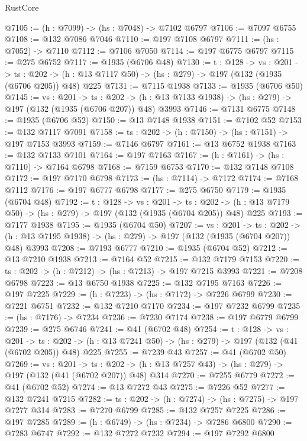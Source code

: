 \begin{lexlean}{RustCore}
\begin{coremodule}
@7105 := (h : @7099) -> (hs : @7048) -> @7102 @6797
@7106 := @7097 @6755
@7108 := @132 @7086 @7046
@7110 := @197 @7108 @6797
@7111 := (hs : @7052) -> @7110
@7112 := @7106 @7050
@7114 := @197 @6775 @6797
@7115 := @275 @6752
@7117 := @1935 (@6706 @48)
@7130 := {t : @128} ->
  {vs : @201} ->
  {ts : @202} -> (h : @13 @7117 @50) -> (hs : @279) -> @197 (@132 (@1935 (@6706 @205)) @48) @225
@7131 := @7115 @1938
@7133 := @1935 (@6706 @50)
@7145 := {vs : @201} ->
  {ts : @202} -> (h : @13 @7133 @1938) -> (hs : @279) -> @197 (@132 (@1935 (@6706 @207)) @48) @3993
@7146 := @7131 @6775
@7148 := @1935 (@6706 @52)
@7150 := @13 @7148 @1938
@7151 := @7102 @52
@7153 := @132 @7117 @7091
@7158 := {ts : @202} -> (h : @7150) -> (hs : @7151) -> @197 @7153 @3993
@7159 := @7146 @6797
@7161 := @13 @6752 @1938
@7163 := @132 @7133 @7101
@7164 := @197 @7163
@7167 := (h : @7161) -> (hs : @7110) -> @7164 @6798
@7168 := @7159 @6753
@7170 := @132 @7148 @7108
@7172 := @197 @7170 @6798
@7173 := (hs : @7114) -> @7172
@7174 := @7168 @7112
@7176 := @197 @6777 @6798
@7177 := @275 @6750
@7179 := @1935 (@6704 @48)
@7192 := {t : @128} ->
  {vs : @201} ->
  {ts : @202} -> (h : @13 @7179 @50) -> (hs : @279) -> @197 (@132 (@1935 (@6704 @205)) @48) @225
@7193 := @7177 @1938
@7195 := @1935 (@6704 @50)
@7207 := {vs : @201} ->
  {ts : @202} -> (h : @13 @7195 @1938) -> (hs : @279) -> @197 (@132 (@1935 (@6704 @207)) @48) @3993
@7208 := @7193 @6777
@7210 := @1935 (@6704 @52)
@7212 := @13 @7210 @1938
@7213 := @7164 @52
@7215 := @132 @7179 @7153
@7220 := {ts : @202} -> (h : @7212) -> (hs : @7213) -> @197 @7215 @3993
@7221 := @7208 @6798
@7223 := @13 @6750 @1938
@7225 := @132 @7195 @7163
@7226 := @197 @7225
@7229 := (h : @7223) -> (hs : @7172) -> @7226 @6799
@7230 := @7221 @6751
@7232 := @132 @7210 @7170
@7234 := @197 @7232 @6799
@7235 := (hs : @7176) -> @7234
@7236 := @7230 @7174
@7238 := @197 @6779 @6799
@7239 := @275 @6746
@7241 := @41 (@6702 @48)
@7254 := {t : @128} ->
  {vs : @201} ->
  {ts : @202} -> (h : @13 @7241 @50) -> (hs : @279) -> @197 (@132 (@41 (@6702 @205)) @48) @225
@7255 := @7239 @43
@7257 := @41 (@6702 @50)
@7269 := {vs : @201} ->
  {ts : @202} -> (h : @13 @7257 @43) -> (hs : @279) -> @197 (@132 (@41 (@6702 @207)) @48) @314
@7270 := @7255 @6779
@7272 := @41 (@6702 @52)
@7274 := @13 @7272 @43
@7275 := @7226 @52
@7277 := @132 @7241 @7215
@7282 := {ts : @202} -> (h : @7274) -> (hs : @7275) -> @197 @7277 @314
@7283 := @7270 @6799
@7285 := @132 @7257 @7225
@7286 := @197 @7285
@7289 := (h : @6749) -> (hs : @7234) -> @7286 @6800
@7290 := @7283 @6747
@7292 := @132 @7272 @7232
@7294 := @197 @7292 @6800

\end{coremodule}
\end{lexlean}
